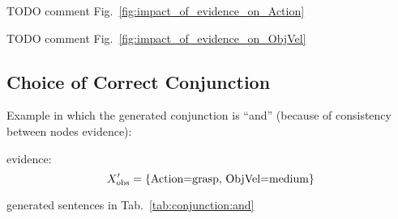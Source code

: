 TODO comment Fig.~\ref{fig:impact_of_evidence_on_Action}


\begin{figure*}
\centering
{} \quad
%
\caption{Predictions about the object velocity of different objects, when given probabilistic soft evidence about the action.}
\label{fig:impact_of_evidence_on_ObjVel}
\end{figure*}

TODO comment Fig.~\ref{fig:impact_of_evidence_on_ObjVel}

\subsection{Choice of Correct Conjunction}

\newcommand{\evidenceProducingAnd}{Action=grasp, ObjVel=medium}

Example in which the generated conjunction is ``and'' (because of consistency between nodes evidence):

evidence:
\begin{equation} \label{eq:evidence_producing_and}
    \xobs^\prime = \{ \text{\evidenceProducingAnd} \}
\end{equation}



generated sentences in Tab.~\ref{tab:conjunction:and}

